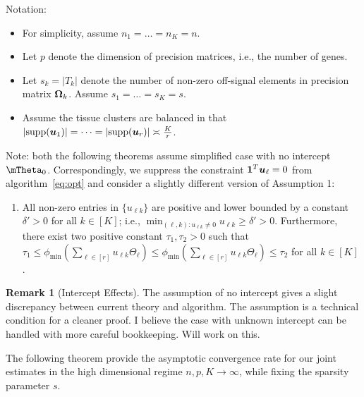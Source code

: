 \documentclass[11pt]{article}
\theoremstyle{plain}
\theoremstyle{definition}
\newtheorem{rmk}{Remark}
\begin{document}
Notation:
\begin{itemize}
\item For simplicity, assume $n_1=\ldots=n_K=n$. 
\item Let $p$ denote the dimension of precision matrices, i.e., the number of genes.  
\item Let $s_k=|T_k|$ denote the number of non-zero off-signal elements in precision matrix $\bm \Omega_k$. Assume $s_1=\ldots=s_K=s$. 
\item Assume the tissue clusters are balanced in that $|\text{supp}(\bm{u}_1)|= \cdots =  |\text{supp}(\bm{u}_r)| \asymp {K\over r}$.
\end{itemize}


Note: both the following theorems assume simplified case with no intercept $\mTheta_0$. Correspondingly, we suppress the constraint $\mathbf{1}^T\bm{u}_\ell=0$ from algorithm~\eqref{eq:opt} and consider a slightly different version of Assumption 1:

\begin{enumerate}
\item All non-zero entries in $\{u_{\ell k}\}$ are positive and lower bounded by a constant $\delta'>0$ for all $k\in[K]$; i.e., $\min_{(\ell,k)\colon u_{\ell k}\neq 0}u_{\ell k}\geq \delta'>0$. Furthermore, there exist two positive constant $\tau_1,\tau_2>0$ such that $\tau_1\leq \phi_{\min}(\sum_{\ell\in[r]}u_{\ell k}\Theta_\ell)\leq \phi_{\min}(\sum_{\ell\in[r]}u_{\ell k}\Theta_\ell) \leq \tau_2$ for all $k\in[K]$. 
\end{enumerate}

\begin{rmk}[Intercept Effects]
The assumption of no intercept gives a slight discrepancy between current theory and algorithm. The assumption is a technical condition for a cleaner proof. I believe the case with unknown intercept can be handled with more careful bookkeeping. Will work on this. 
\end{rmk}



The following theorem provide the asymptotic convergence rate for our joint estimates in the high dimensional regime $n,p, K\to \infty$, while fixing the sparsity parameter $s$. 
\end{document}
